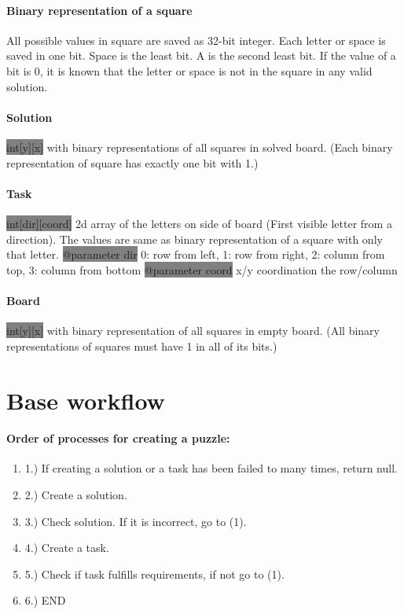 \documentclass{report}
\begin{document}
\paragraph{Binary representation of a square}
All possible values in square are saved as 32-bit integer. Each letter or space is saved in one bit. Space is the least bit. A is the second least bit. If the value of a bit is 0, it is known that the letter or space is not in the square in any valid solution.

\paragraph{Solution}
\colorbox{gray}{int[y][x]} with binary representations of all squares in solved board. (Each binary representation of square has exactly one bit with 1.)

\paragraph{Task}
\colorbox{gray}{int[dir][coord]} 2d array of the letters on side of board (First visible letter from a direction). The values are same as binary representation of a square with only that letter.\newline
\colorbox{gray}{@parameter dir} 0: row from left, 1: row from right, 2: column from top, 3: column from bottom\newline
\colorbox{gray}{@parameter coord} x/y coordination the row/column

\paragraph{Board}
\colorbox{gray}{int[y][x]} with binary representation of all squares in empty board. (All binary representations of squares must have 1 in all of its bits.)

\section{Base workflow}

\paragraph{Order of processes for creating a puzzle:}
\begin{enumerate}
    \item[] 1.) If creating a solution or a task has been failed to many times, return null.
    \item[] 2.) Create a solution.
    \item[] 3.) Check solution. If it is incorrect, go to (1).
    \item[] 4.) Create a task.
    \item[] 5.) Check if task fulfills requirements, if not go to (1).
    \item[] 6.) END
\end{enumerate}
\end{document}
